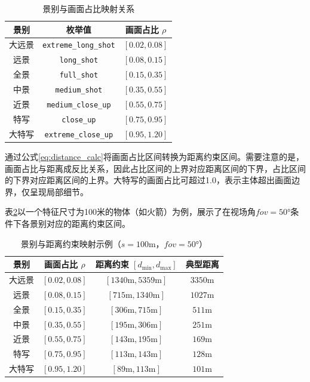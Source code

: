 \begin{table}[htbp]
\centering
\caption{景别与画面占比映射关系}
\label{tab:shot_scale_ratio}
\begin{tabular}{ccc}
\toprule
景别 & 枚举值 & 画面占比 $\rho$ \\
\midrule
大远景 & \texttt{extreme\_long\_shot} & $[0.02, 0.08]$ \\
远景 & \texttt{long\_shot} & $[0.08, 0.15]$ \\
全景 & \texttt{full\_shot} & $[0.15, 0.35]$ \\
中景 & \texttt{medium\_shot} & $[0.35, 0.55]$ \\
近景 & \texttt{medium\_close\_up} & $[0.55, 0.75]$ \\
特写 & \texttt{close\_up} & $[0.75, 0.95]$ \\
大特写 & \texttt{extreme\_close\_up} & $[0.95, 1.20]$ \\
\bottomrule
\end{tabular}
\end{table}

通过公式\ref{eq:distance_calc}将画面占比区间转换为距离约束区间。需要注意的是，画面占比与距离成反比关系，因此占比区间的上界对应距离区间的下界，占比区间的下界对应距离区间的上界。大特写的画面占比可超过1.0，表示主体超出画面边界，仅呈现局部细节。

表\ref{tab:shot_distance_example}以一个特征尺寸为100米的物体（如火箭）为例，展示了在视场角$\textit{fov}=50°$条件下各景别对应的距离约束区间。

\begin{table}[htbp]
\centering
\caption{景别与距离约束映射示例（$s=100\text{m}$，$\textit{fov}=50°$）}
\label{tab:shot_distance_example}
\begin{tabular}{cccc}
\toprule
景别 & 画面占比 $\rho$ & 距离约束 $[d_{\min}, d_{\max}]$ & 典型距离 \\
\midrule
大远景 & $[0.02, 0.08]$ & $[1340\text{m}, 5359\text{m}]$ & $3350\text{m}$ \\
远景 & $[0.08, 0.15]$ & $[715\text{m}, 1340\text{m}]$ & $1027\text{m}$ \\
全景 & $[0.15, 0.35]$ & $[306\text{m}, 715\text{m}]$ & $511\text{m}$ \\
中景 & $[0.35, 0.55]$ & $[195\text{m}, 306\text{m}]$ & $251\text{m}$ \\
近景 & $[0.55, 0.75]$ & $[143\text{m}, 195\text{m}]$ & $169\text{m}$ \\
特写 & $[0.75, 0.95]$ & $[113\text{m}, 143\text{m}]$ & $128\text{m}$ \\
大特写 & $[0.95, 1.20]$ & $[89\text{m}, 113\text{m}]$ & $101\text{m}$ \\
\bottomrule
\end{tabular}
\end{table}

